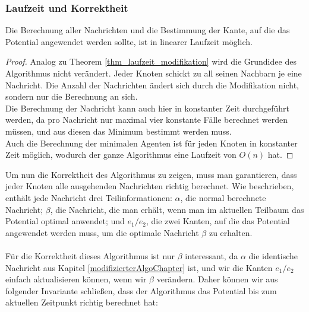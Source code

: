 	
	\subsubsection{Laufzeit und Korrektheit}
	
	\begin{theorem}
		Die Berechnung aller Nachrichten und die Bestimmung der Kante, auf die das Potential angewendet werden sollte, ist in linearer Laufzeit möglich.
	\end{theorem}
	\begin{proof}
		Analog zu Theorem \ref{thm_laufzeit_modifikation} wird die Grundidee des Algorithmus nicht verändert. Jeder Knoten schickt zu all seinen Nachbarn je eine Nachricht. Die Anzahl der Nachrichten ändert sich durch die Modifikation nicht, sondern nur die Berechnung an sich.\\Die Berechnung der Nachricht kann auch hier in konstanter Zeit durchgeführt werden, da pro Nachricht nur maximal vier konstante Fälle berechnet werden müssen, und aus diesen das Minimum bestimmt werden muss.\\
		Auch die Berechnung der minimalen Agenten ist für jeden Knoten in konstanter Zeit möglich, wodurch der ganze Algorithmus eine Laufzeit von $O(n)$ hat.
	\end{proof}
	
	
	Um nun die Korrektheit des Algorithmus zu zeigen, muss man garantieren, dass jeder Knoten alle ausgehenden Nachrichten richtig berechnet. Wie beschrieben, enthält jede Nachricht drei Teilinformationen: $\alpha$, die normal berechnete Nachricht; $\beta$, die Nachricht, die man erhält, wenn man im aktuellen Teilbaum das Potential optimal anwendet; und $e_1/e_2$, die zwei Kanten, auf die das Potential angewendet werden muss, um die optimale Nachricht $\beta$ zu erhalten.
	\\
	\\
	Für die Korrektheit dieses Algorithmus ist nur $\beta$ interessant, da $\alpha$ die identische Nachricht aus Kapitel \ref{modifizierterAlgoChapter} ist, und wir die Kanten $e_1/e_2$ einfach aktualisieren können, wenn wir $\beta$ verändern. Daher können wir aus folgender Invariante schließen, dass der Algorithmus das Potential bis zum aktuellen Zeitpunkt richtig berechnet hat:
	
